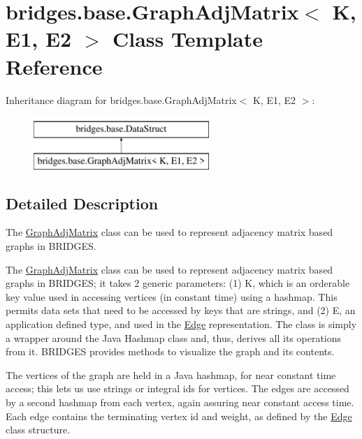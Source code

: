 \hypertarget{classbridges_1_1base_1_1_graph_adj_matrix}{}\section{bridges.\+base.\+Graph\+Adj\+Matrix$<$ K, E1, E2 $>$ Class Template Reference}
\label{classbridges_1_1base_1_1_graph_adj_matrix}
Inheritance diagram for bridges.\+base.\+Graph\+Adj\+Matrix$<$ K, E1, E2 $>$\+:\begin{figure}[H]
\begin{center}
\leavevmode
\includegraphics[height=2.000000cm]{classbridges_1_1base_1_1_graph_adj_matrix}
\end{center}
\end{figure}


\subsection{Detailed Description}
The \hyperlink{classbridges_1_1base_1_1_graph_adj_matrix}{Graph\+Adj\+Matrix} class can be used to represent adjacency matrix based graphs in B\+R\+I\+D\+G\+ES. 

The \hyperlink{classbridges_1_1base_1_1_graph_adj_matrix}{Graph\+Adj\+Matrix} class can be used to represent adjacency matrix based graphs in B\+R\+I\+D\+G\+ES; it takes 2 generic parameters\+: (1) K, which is an orderable key value used in accessing vertices (in constant time) using a hashmap. This permits data sets that need to be accessed by keys that are strings, and (2) E, an application defined type, and used in the \hyperlink{classbridges_1_1base_1_1_edge}{Edge} representation. The class is simply a wrapper around the Java Hashmap class and, thus, derives all its operations from it. B\+R\+I\+D\+G\+ES provides methods to visualize the graph and its contents.

The vertices of the graph are held in a Java hashmap, for near constant time access; this lets us use strings or integral ids for vertices. The edges are accessed by a second hashmap from each vertex, again assuring near constant access time. Each edge contains the terminating vertex id and weight, as defined by the \hyperlink{classbridges_1_1base_1_1_edge}{Edge} class structure.

